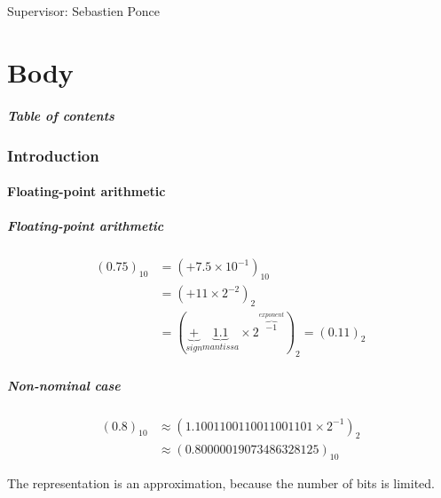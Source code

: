 \documentclass{beamer}
\begin{document}
\begin{frame}
    \maketitle

    Supervisor: Sebastien Ponce
\end{frame}

\part{Body}

\begin{frame}
    \frametitle{Table of contents}
    \tableofcontents
\end{frame}

\section{Introduction}

\begin{frame}
    \tableofcontents[currentsection]
\end{frame}

\subsection{Floating-point arithmetic}

\begin{frame}
    \frametitle{Floating-point arithmetic}

    \begin{displaymath}
        \begin{split}
            (0.75)_{10} & = (+ 7.5 \times 10^{-1})_{10} \\
            & = (+11 \times 2^{-2})_{2} \\
            & = (\underbrace{+}_{sign} \underbrace{1.1}_{mantissa} \times 2^{\overbrace{-1}^{exponent}})_{2} = (0.11)_{2}
        \end{split}
    \end{displaymath}
\end{frame}

\begin{frame}
    \frametitle{Non-nominal case}

    \begin{displaymath}
        \begin{split}
            (0.8)_{10} & \approx (1.1001100110011001101 \times 2^{-1})_{2} \\
            & \approx (0.80000019073486328125)_{10}
        \end{split}
    \end{displaymath}

    The representation is an approximation, because the number of bits is limited.
\end{frame}
\end{document}
